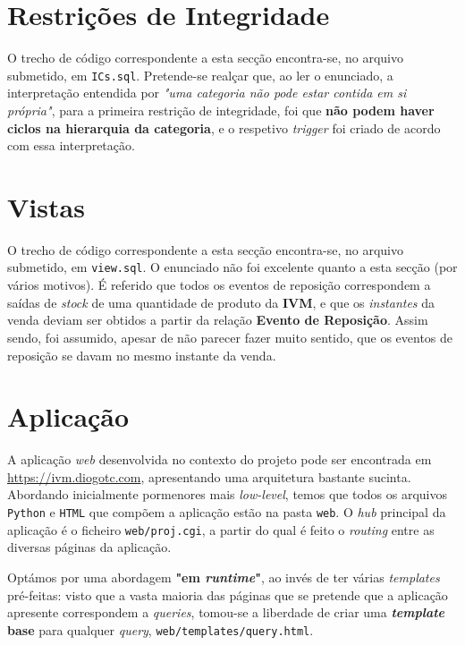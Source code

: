 \documentclass[12pt,a4paper]{article}
\begin{document}

  

  \section*{Restrições de Integridade}

  O trecho de código correspondente a esta secção encontra-se, no arquivo submetido,
  em \texttt{ICs.sql}. Pretende-se realçar que, ao ler o enunciado, a interpretação
  entendida por \textit{"uma categoria não pode estar contida em si própria"}, para
  a primeira restrição de integridade, foi que \textbf{não podem haver ciclos na
  hierarquia da categoria}, e o respetivo \textit{trigger} foi criado de acordo
  com essa interpretação.

  \section*{Vistas}

  O trecho de código correspondente a esta secção encontra-se, no arquivo submetido,
  em \texttt{view.sql}. O enunciado não foi excelente quanto a esta secção (por vários motivos).
  É referido que todos os eventos de reposição correspondem a saídas de \textit{stock} de uma
  quantidade de produto da \textbf{IVM}, e que os \textit{instantes} da venda
  deviam ser obtidos a partir da relação \textbf{Evento de Reposição}. Assim sendo,
  foi assumido, apesar de não parecer fazer muito sentido, que os eventos de reposição
  se davam no mesmo instante da venda.

  \section*{Aplicação}

  A aplicação \textit{web} desenvolvida no contexto do projeto pode ser encontrada
  em \url{https://ivm.diogotc.com}, apresentando uma arquitetura bastante sucinta.
  Abordando inicialmente pormenores mais \textit{low-level}, temos que todos os arquivos
  \texttt{Python} e \texttt{HTML} que compõem a aplicação estão na pasta \texttt{web}.
  O \textit{hub} principal da aplicação é o ficheiro \texttt{web/proj.cgi}, a partir do qual
  é feito o \textit{routing} entre as diversas páginas da aplicação.

  Optámos por uma abordagem \textbf{"em \textit{runtime}"}, ao invés de ter várias \textit{templates}
  pré-feitas: visto que a vasta maioria das páginas que se pretende que a aplicação
  apresente correspondem a \textit{queries}, tomou-se a liberdade de criar uma
  \textbf{\textit{template} base} para qualquer \textit{query}, \texttt{web/templates/query.html}.
  
\end{document}
